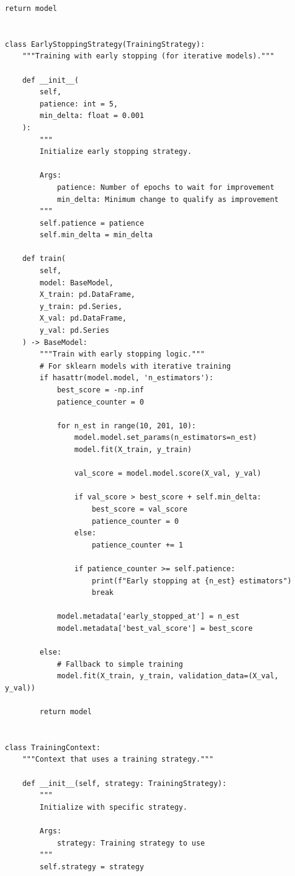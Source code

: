 \begin{lstlisting}[style=python, caption=Strategy pattern for flexible model selection]
        return model


class EarlyStoppingStrategy(TrainingStrategy):
    """Training with early stopping (for iterative models)."""

    def __init__(
        self,
        patience: int = 5,
        min_delta: float = 0.001
    ):
        """
        Initialize early stopping strategy.

        Args:
            patience: Number of epochs to wait for improvement
            min_delta: Minimum change to qualify as improvement
        """
        self.patience = patience
        self.min_delta = min_delta

    def train(
        self,
        model: BaseModel,
        X_train: pd.DataFrame,
        y_train: pd.Series,
        X_val: pd.DataFrame,
        y_val: pd.Series
    ) -> BaseModel:
        """Train with early stopping logic."""
        # For sklearn models with iterative training
        if hasattr(model.model, 'n_estimators'):
            best_score = -np.inf
            patience_counter = 0

            for n_est in range(10, 201, 10):
                model.model.set_params(n_estimators=n_est)
                model.fit(X_train, y_train)

                val_score = model.model.score(X_val, y_val)

                if val_score > best_score + self.min_delta:
                    best_score = val_score
                    patience_counter = 0
                else:
                    patience_counter += 1

                if patience_counter >= self.patience:
                    print(f"Early stopping at {n_est} estimators")
                    break

            model.metadata['early_stopped_at'] = n_est
            model.metadata['best_val_score'] = best_score

        else:
            # Fallback to simple training
            model.fit(X_train, y_train, validation_data=(X_val, y_val))

        return model


class TrainingContext:
    """Context that uses a training strategy."""

    def __init__(self, strategy: TrainingStrategy):
        """
        Initialize with specific strategy.

        Args:
            strategy: Training strategy to use
        """
        self.strategy = strategy


\end{lstlisting}

